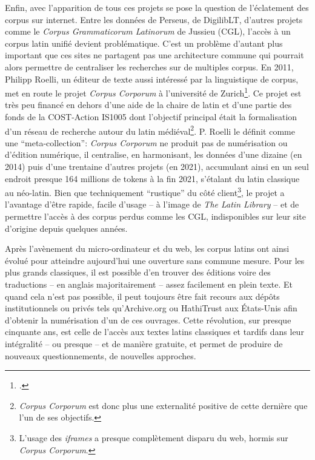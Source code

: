 Enfin, avec l'apparition de tous ces projets se pose la question de l'éclatement des corpus sur internet. Entre les données de Perseus, de DigilibLT, d'autres projets comme le \textit{Corpus Grammaticorum Latinorum} de Jussieu (CGL), l'accès à un corpus latin unifié devient problématique. C'est un problème d'autant plus important que ces sites ne partagent pas une architecture commune qui pourrait alors permettre de centraliser les recherches sur de multiples corpus. En 2011, Philipp Roelli, un éditeur de texte aussi intéressé par la linguistique de corpus, met en route le projet \textit{Corpus Corporum} à l'université de Zurich\footcite{roelli2014corpus}. Ce projet est très peu financé en dehors d'une aide de la chaire de latin et d'une partie des fonds de la COST-Action IS1005 dont l'objectif principal était la formalisation d'un réseau de recherche autour du latin médiéval\footnote{\textit{Corpus Corporum} est donc plus une externalité positive de cette dernière que l'un de ses objectifs.}. P. Roelli le définit comme une ``meta-collection'': \textit{Corpus Corporum} ne produit pas de numérisation ou d'édition numérique, il centralise, en harmonisant, les données d'une dizaine (en 2014) puis d'une trentaine d'autres projets (en 2021), accumulant ainsi en un seul endroit presque 164 millions de tokens à la fin 2021, s'étalant du latin classique au néo-latin. Bien que techniquement ``rustique'' du côté client\footnote{L'usage des \textit{iframes} a presque complètement disparu du web, hormis sur \textit{Corpus Corporum}.}, le projet a l'avantage d'être rapide, facile d'usage -- à l'image de \textit{The Latin Library} -- et de permettre l'accès à des corpus perdus comme les CGL, indisponibles sur leur site d'origine depuis quelques années.

Après l'avènement du micro-ordinateur et du web, les corpus latins ont ainsi évolué pour atteindre aujourd'hui une ouverture sans commune mesure. Pour les plus grands classiques, il est possible d'en trouver des éditions voire des traductions -- en anglais majoritairement -- assez facilement en plein texte. Et quand cela n'est pas possible, il peut toujours être fait recours aux dépôts institutionnels ou privés tels qu'Archive.org ou HathiTrust aux États-Unis afin d'obtenir la numérisation d'un de ces ouvrages. Cette révolution, sur presque cinquante ans, est celle de l'accès aux textes latins classiques et tardifs dans leur intégralité -- ou presque -- et de manière gratuite, et permet de produire de nouveaux questionnements, de nouvelles approches.

